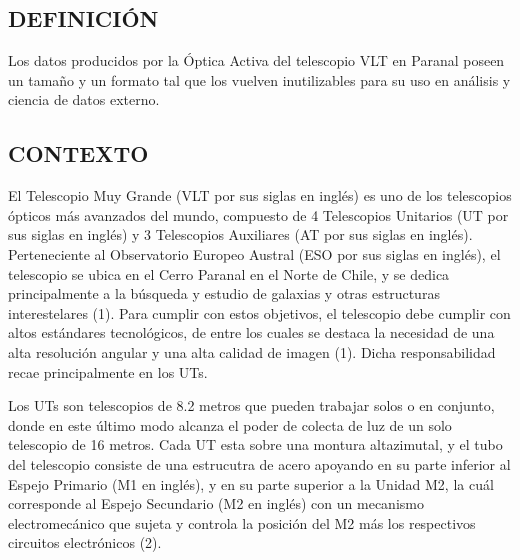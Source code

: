 
\subsection{DEFINICIÓN}

Los datos producidos por la Óptica Activa del telescopio VLT en Paranal poseen un tamaño y un formato tal que los vuelven inutilizables para su uso en análisis y ciencia de datos externo.

\subsection{CONTEXTO}

El Telescopio Muy Grande (VLT por sus siglas en inglés) es uno de los telescopios ópticos más avanzados del mundo, compuesto de 4 Telescopios Unitarios (UT por sus siglas en inglés) y 3 Telescopios Auxiliares (AT por sus siglas en inglés).
Perteneciente al Observatorio Europeo Austral (ESO por sus siglas en inglés), el telescopio se ubica en el Cerro Paranal en el Norte de Chile, y se dedica principalmente a la búsqueda y estudio de galaxias y otras estructuras interestelares (1).
Para cumplir con estos objetivos, el telescopio debe cumplir con altos estándares tecnológicos, de entre los cuales se destaca la necesidad de una alta resolución angular y una alta calidad de imagen (1). Dicha responsabilidad recae principalmente en los UTs.

Los UTs son telescopios de 8.2 metros que pueden trabajar solos o en conjunto, donde en este último modo alcanza el poder de colecta de luz de un solo telescopio de 16 metros.
Cada UT esta sobre una montura altazimutal, y el tubo del telescopio consiste de una estrucutra de acero apoyando en su parte inferior al Espejo Primario (M1 en inglés), y en su parte superior a la Unidad M2, la cuál corresponde al Espejo Secundario (M2 en inglés) con un mecanismo electromecánico que sujeta y controla la posición del M2 más los respectivos circuitos electrónicos (2).

